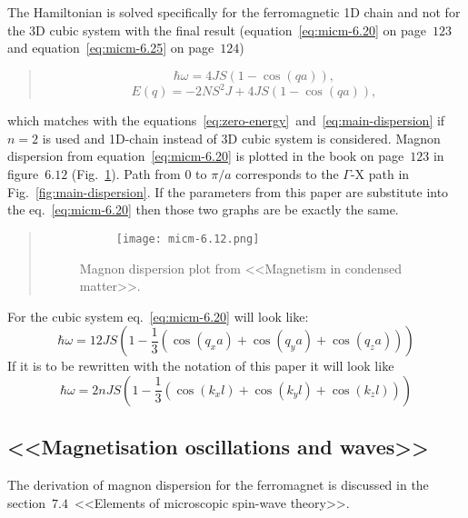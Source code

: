     The Hamiltonian is solved specifically for the ferromagnetic 1D chain and not for the 3D cubic system with the final result (equation~\ref{eq:micm-6.20} on page~$123$ and equation~\ref{eq:micm-6.25} on page~$124$)
    \begin{quote}
        \begin{equation}
            \hbar\omega = 4JS(1 - \cos(qa)), \label{eq:micm-6.20} \tag{6.20}
        \end{equation}
        \begin{equation}
           E(q) = -2NS^2J + 4JS(1 - \cos(qa)), \label{eq:micm-6.25} \tag{6.25}
        \end{equation}
    \end{quote}
    which matches with the equations~\eqref{eq:zero-energy}~and~\eqref{eq:main-dispersion} if $n = 2$ is used and 1D-chain instead of 3D cubic system is considered. 
    Magnon dispersion from equation~\eqref{eq:micm-6.20} is plotted in the book on page~$123$ in figure~$6.12$ (Fig.~\ref{fig:micm-6.12}). 
    Path from $0$ to $\pi / a$ corresponds to the $\Gamma$-X path in Fig.~\ref{fig:main-dispersion}. If the parameters from this paper are substitute into the eq.~\eqref{eq:micm-6.20} then those two graphs are be exactly the same.
    \begin{quote}
        \begin{figure}[H]
            \centering
            \begin{subfigure}[b]{0.5\textwidth}
                \centering
                \texttt{[image: micm-6.12.png]}
            \end{subfigure}
            \hfill
            \caption{Magnon dispersion plot from <<Magnetism in condensed matter>>.}
            \label{fig:micm-6.12}
        \end{figure}
    \end{quote}
    For the cubic system eq.~\ref{eq:micm-6.20} will look like:
    \begin{equation}
        \hbar\omega = 12JS(1 - \dfrac{1}{3}(\cos(q_xa) + \cos(q_ya) + \cos(q_za)))
    \end{equation}
    If it is to be rewritten with the notation of this paper it will look like
    \begin{equation}
        \hbar\omega = 2nJS(1 - \dfrac{1}{3}(\cos(k_xl) + \cos(k_yl) + \cos(k_zl)))
    \end{equation}

\subsection{<<Magnetisation oscillations and waves>>\cite{gurevich1996magnetization}}
    The derivation of magnon dispersion for the ferromagnet is discussed in the section~$7.4$~<<Elements of microscopic spin-wave theory>>.

